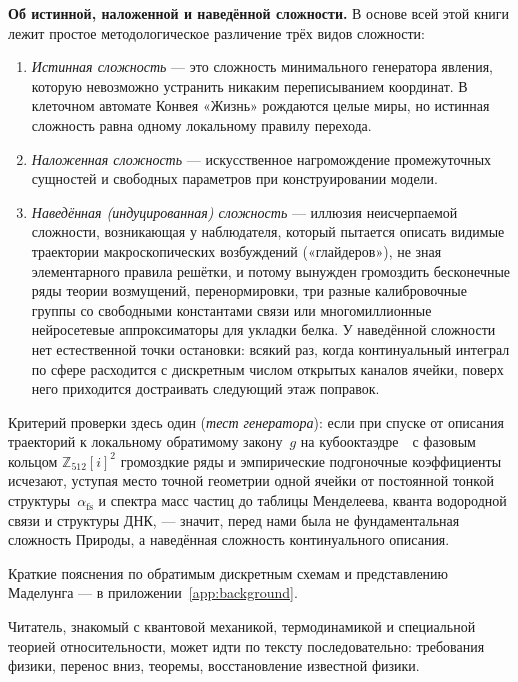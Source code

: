 \medskip
\noindent
\textbf{Об истинной, наложенной и наведённой сложности.}
В основе всей этой книги лежит простое методологическое различение трёх видов сложности:
\begin{enumerate}[leftmargin=*,noitemsep]
\item \emph{Истинная сложность} --- это сложность минимального генератора явления, которую невозможно устранить никаким переписыванием координат. В клеточном автомате Конвея «Жизнь» рождаются целые миры, но истинная сложность равна одному локальному правилу перехода.
\item \emph{Наложенная сложность} --- искусственное нагромождение промежуточных сущностей и свободных параметров при конструировании модели.
\item \emph{Наведённая (индуцированная) сложность} --- иллюзия неисчерпаемой сложности, возникающая у наблюдателя, который пытается описать видимые траектории макроскопических возбуждений («глайдеров»), не зная элементарного правила решётки, и потому вынужден громоздить бесконечные ряды теории возмущений, перенормировки, три разные калибровочные группы со свободными константами связи или многомиллионные нейросетевые аппроксиматоры для укладки белка. У наведённой сложности нет естественной точки остановки: всякий раз, когда континуальный интеграл по сфере расходится с дискретным числом открытых каналов ячейки, поверх него приходится достраивать следующий этаж поправок.
\end{enumerate}
Критерий проверки здесь один (\emph{тест генератора}): если при спуске от описания траекторий к локальному обратимому закону~$g$ на кубооктаэдре~\latGCKshort\ с фазовым кольцом $\mathbb{Z}_{512}[i]^2$ громоздкие ряды и эмпирические подгоночные коэффициенты исчезают, уступая место точной геометрии одной ячейки от постоянной тонкой структуры~$\alpha_{\mathrm{fs}}$ и спектра масс частиц до таблицы Менделеева, кванта водородной связи и структуры ДНК, --- значит, перед нами была не фундаментальная сложность Природы, а наведённая сложность континуального описания.

Краткие пояснения по обратимым дискретным схемам и представлению Маделунга ---
в приложении~\ref{app:background}.

Читатель, знакомый с квантовой механикой, термодинамикой и специальной теорией относительности,
может идти по тексту последовательно: требования физики, перенос вниз, теоремы, восстановление известной физики.

\cleardoublepage

